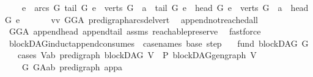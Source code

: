 \begin{isabellebody}
\ \ \ \ {\isacharbraceleft}{\kern0pt}e\ {\isasymin}\ arcs\ G{\isachardot}{\kern0pt}\ tail\ G\ e\ {\isasymin}\ verts\ G\ {\isasymand}\ a\ {\isasymrightarrow}\isactrlsup {\isacharplus}{\kern0pt}\ tail\ G\ e\ {\isasymand}\ head\ G\ e\ {\isasymin}\ verts\ G\ {\isasymand}\ a\ {\isasymrightarrow}\isactrlsup {\isacharplus}{\kern0pt}\ head\ G\ e{\isacharbraceright}{\kern0pt}\ {\isachardoublequoteclose}\isanewline
\ \ \ \ \isamarkupfalse%
\ vv\ GG{\isacharunderscore}{\kern0pt}A\ pre{\isacharunderscore}{\kern0pt}digraph{\isachardot}{\kern0pt}arcs{\isacharunderscore}{\kern0pt}del{\isacharunderscore}{\kern0pt}vert\ \isamarkupfalse%
\ append{\isacharunderscore}{\kern0pt}not{\isacharunderscore}{\kern0pt}reached{\isacharunderscore}{\kern0pt}all\isanewline
\ \ \ \ \isamarkupfalse%
\ GG{\isacharunderscore}{\kern0pt}A\ append{\isacharunderscore}{\kern0pt}head\ append{\isacharunderscore}{\kern0pt}tail\ assms\ reachable{}{\isacharunderscore}{\kern0pt}preserve\ \isamarkupfalse%
\ fastforce\ \isanewline
{}\isamarkupfalse%
%
\endisatagproof
{\isafoldproof}%
%
\isadelimproof
\isanewline
%
\endisadelimproof
\isanewline
\isanewline
\isanewline
{}\isamarkupfalse%
\ blockDAG{\isacharunderscore}{\kern0pt}induct{\isacharunderscore}{\kern0pt}append{\isacharbrackleft}{\kern0pt}consumes\ {}{\isacharcomma}{\kern0pt}\ case{\isacharunderscore}{\kern0pt}names\ base\ step{\isacharbrackright}{\kern0pt}{\isacharcolon}{\kern0pt}\isanewline
\ \ \ fund{\isacharcolon}{\kern0pt}\ {\isachardoublequoteopen}blockDAG\ G{\isachardoublequoteclose}\isanewline
\ \ \ cases{\isacharcolon}{\kern0pt}\ {\isachardoublequoteopen}{\isasymAnd}V{\isacharcolon}{\kern0pt}{\isacharcolon}{\kern0pt}{\isacharparenleft}{\kern0pt}{\isacharprime}{\kern0pt}a{\isacharcomma}{\kern0pt}{\isacharprime}{\kern0pt}b{\isacharparenright}{\kern0pt}\ pre{\isacharunderscore}{\kern0pt}digraph{\isachardot}{\kern0pt}\ blockDAG\ V\ {\isasymLongrightarrow}\ P\ {\isacharparenleft}{\kern0pt}blockDAG{\isachardot}{\kern0pt}gen{\isacharunderscore}{\kern0pt}graph\ V{\isacharparenright}{\kern0pt}{\isachardoublequoteclose}\isanewline
\ \ \ \ {\isachardoublequoteopen}{\isasymAnd}G\ G{\isacharunderscore}{\kern0pt}A{\isacharcolon}{\kern0pt}{\isacharcolon}{\kern0pt}{\isacharparenleft}{\kern0pt}{\isacharprime}{\kern0pt}a{\isacharcomma}{\kern0pt}{\isacharprime}{\kern0pt}b{\isacharparenright}{\kern0pt}\ pre{\isacharunderscore}{\kern0pt}digraph{\isachardot}{\kern0pt}\ {\isasymAnd}app{\isacharcolon}{\kern0pt}{\isacharcolon}{\kern0pt}{\isacharprime}{\kern0pt}a{\isachardot}{\kern0pt}\ \isanewline

\end{isabellebody}
